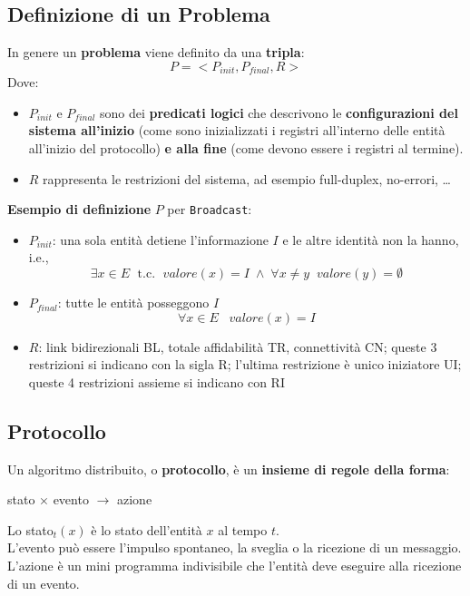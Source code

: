 \newpage

\subsection{Definizione di un Problema}

In genere un \textbf{problema} viene definito da una \textbf{tripla}: 
$$ P = <P_{init}, P_{final}, R> $$
Dove: 
\begin{itemize}
	\item $P_{init}$ e $P_{final}$ sono dei \textbf{predicati logici} che descrivono le \textbf{configurazioni del sistema all'inizio} (come sono inizializzati i registri all'interno delle entità all'inizio del protocollo) \textbf{e alla fine} (come devono essere i registri al termine).\\
	
	\item $R$ rappresenta le restrizioni del sistema, ad esempio full-duplex, no-errori, \dots\\
\end{itemize}

\textbf{Esempio di definizione} $P$ per \texttt{Broadcast}:
\begin{itemize}
	\item $P_{init}$: una sola entità detiene l'informazione $I$ e le altre identità non la hanno, i.e., 
	$$ \exists x \in E \; \text{ t.c. }\; valore(x) = I \; \wedge \; \forall x \neq y \;\; valore (y) = \emptyset $$
	
	\item $P_{final}$: tutte le entità posseggono $I$
	$$ \forall x \in E \;\;\; valore(x) = I $$
	
	\item $R$: link bidirezionali BL, totale affidabilità TR, connettività CN; queste 3 restrizioni si indicano con la sigla R; l'ultima restrizione è unico iniziatore UI; queste 4 restrizioni assieme si indicano con RI
\end{itemize}

\newpage

\subsection{Protocollo}

Un algoritmo distribuito, o \textbf{protocollo}, è un \textbf{insieme di regole della forma}: 
\begin{center}
	stato $\times$ evento $\rightarrow$ azione
\end{center}
Lo stato$_t (x)$ è lo stato dell'entità $x$ al tempo $t$. \\
L'evento può essere l'impulso spontaneo, la sveglia o la ricezione di un messaggio. \\
L'azione è un mini programma indivisibile che l'entità deve eseguire alla ricezione di un evento.\\

